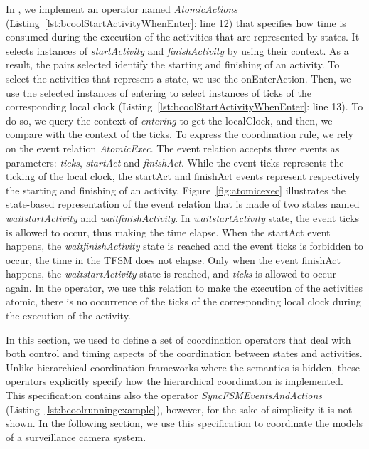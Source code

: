 In \bcool, we implement an operator named \emph{AtomicActions} (Listing~\ref{lst:bcoolStartActivityWhenEnter}: line 12) that specifies how time is consumed during the execution of the activities that are represented by states. It selects instances of \dse \emph{startActivity} and \emph{finishActivity} by using their context. As a result, the pairs selected identify the starting and finishing of an activity. To select the activities that represent a state, we use the onEnterAction. Then, we use the selected instances of \dse entering to select instances of \dse ticks of the corresponding local clock (Listing~\ref{lst:bcoolStartActivityWhenEnter}: line 13). To do so, we query the context of \dse \emph{entering} to get the localClock, and then, we compare with the context of the \dse ticks. To express the coordination rule, we rely on the event relation \emph{AtomicExec}. The event relation accepts three events as parameters: \emph{ticks}, \emph{startAct} and \emph{finishAct}. While the event ticks represents the ticking of the local clock, the startAct and finishAct events represent respectively the starting and finishing of an activity. Figure~\ref{fig:atomicexec} illustrates the state-based representation of the event relation that is made of two states named \emph{waitstartActivity} and \emph{waitfinishActivity}. In \emph{waitstartActivity} state, the event ticks is allowed to occur, thus making the time elapse. When the startAct event happens, the \emph{waitfinishActivity} state is reached and the event ticks is forbidden to occur, \ie the time in the TFSM does not elapse. Only when the event finishAct happens, the \emph{waitstartActivity} state is reached, and \emph{ticks} is allowed to occur again. In the operator, we use this relation to make the execution of the activities atomic, \ie there is no occurrence of the \dse ticks of the corresponding local clock during the execution of the activity.

In this section, we used \bcool to define a set of coordination operators that deal with both control and timing aspects of the coordination between states and activities. Unlike hierarchical coordination frameworks where the semantics is hidden, these operators explicitly specify how the hierarchical coordination is implemented. This specification contains also the operator \emph{SyncFSMEventsAndActions} (Listing~\ref{lst:bcoolrunningexample}), however, for the sake of simplicity it is not shown. In the following section, we use this specification to coordinate the models of a surveillance camera system.

